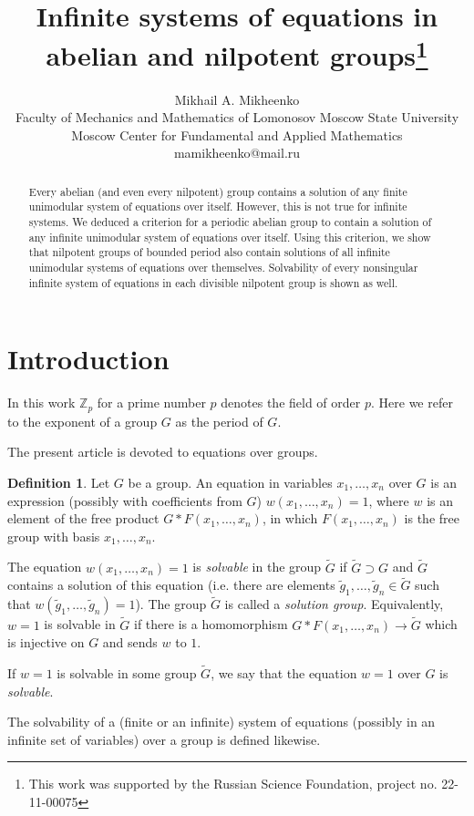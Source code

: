 \documentclass{article}
\theoremstyle{definition}
\newtheorem*{defin}{Definition}
\theoremstyle{remark}
\let\tilde\widetilde
\begin{document}
\title{Infinite systems of equations
in abelian and nilpotent groups\footnote{
This work was supported by
the Russian Science Foundation, 
project no. 22-11-00075}
}
\author{Mikhail A. Mikheenko
\\{\small
Faculty of Mechanics and Mathematics
of Lomonosov Moscow State University
}
\\{\small
Moscow Center for
Fundamental and Applied Mathematics}\\
{\normalsize mamikheenko@mail.ru}
}
\date{}
\maketitle

\begin{abstract}
Every abelian (and even every nilpotent)
group contains a solution of
any finite unimodular system
of equations over itself.
However, this is not true for infinite systems.
We deduced a criterion
for a periodic abelian group
to contain a solution of
any infinite unimodular system
of equations over itself.
Using this criterion, we show
that nilpotent groups of bounded period
also contain solutions of
all infinite unimodular systems of equations
over themselves.
Solvability of every nonsingular
infinite system of equations
in each divisible nilpotent group
is shown as well.
\end{abstract}

\section{Introduction}

In this work $\mathbb Z_p$ for a prime number $p$ denotes
the field of order $p$. Here we refer to the exponent of a group $G$
as the period of $G$.

The present article is devoted to equations over groups.

\begin{defin}
Let $G$ be a group.
An equation in variables $x_1,\ldots,x_n$
over $G$ is an expression (possibly with coefficients from $G$)
$w(x_1,\ldots,x_n)=1$, where $w$ is an element of the free product
$G*F(x_1,\ldots,x_n)$,
in which $F(x_1,\ldots,x_n)$ is the free group
with basis $x_1,\ldots,x_n$.

The equation $w(x_1,\ldots,x_n)=1$ is {\it solvable} in the group
$\tilde G$ if $\tilde G \supset G$ and $\tilde G$ contains a
solution of this equation (i.e. there are elements
$\tilde g_1,\ldots,\tilde g_n \in \tilde G$ such that $w(\tilde g_1,\ldots, \tilde g_n)=1$).
The group $\tilde G$ is called a {\it solution group}.
Equivalently, $w=1$ is solvable in $\tilde G$
if there is a homomorphism $G*F(x_1,\ldots,x_n) \to \tilde G$
which is injective on $G$ and sends $w$ to $1$.

If $w=1$ is solvable in some group $\tilde G$,
we say that the equation $w=1$ over $G$ is {\it solvable}.

The solvability of a (finite or an infinite) system of equations
(possibly in an infinite set of variables)
over a group is defined likewise.
\end{defin}
\end{document}
